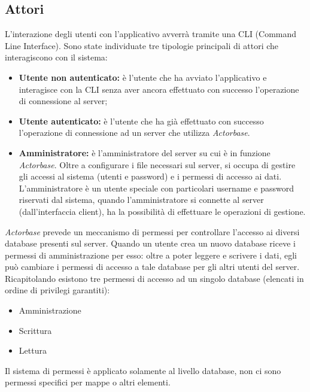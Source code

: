 \documentclass[a4paper]{article}
\begin{document}
		\subsection{Attori}
		L'interazione degli utenti con l'applicativo avverrà tramite una CLI (Command Line Interface).
		Sono state individuate tre tipologie principali di attori che interagiscono con il sistema:
		\begin{itemize}
			\item \textbf{Utente non autenticato:} è l'utente che ha avviato l'applicativo e interagisce con la CLI senza aver ancora effettuato con successo l'operazione di connessione al server;
			\item \textbf{Utente autenticato:} è l'utente che ha già effettuato con successo l'operazione di connessione ad un server che utilizza \emph{Actorbase}. 
			\item \textbf{Amministratore:} è l'amministratore del server su cui è in funzione \emph{Actorbase}. Oltre a configurare i file necessari sul server, si occupa di gestire gli accessi al sistema (utenti e password) e i permessi di accesso ai dati. L'amministratore è un utente speciale con particolari username e password riservati dal sistema, quando l'amministratore si connette al server (dall'interfaccia client), ha la possibilità di effettuare le operazioni di gestione.
		\end{itemize}
		\emph{Actorbase} prevede un meccanismo di permessi per controllare l'accesso ai diversi database presenti sul server. Quando un utente crea un nuovo database riceve i permessi di amministrazione per esso: oltre a poter leggere e scrivere i dati, egli può cambiare i permessi di accesso a tale database per gli altri utenti del server. \\ 
		Ricapitolando esistono tre permessi di accesso ad un singolo database (elencati in ordine di privilegi garantiti):
		\begin{itemize}
		\item Amministrazione
		\item Scrittura
		\item Lettura
		\end{itemize}
		Il sistema di permessi è applicato solamente al livello database, non ci sono permessi specifici per mappe o altri elementi.
\end{document}
